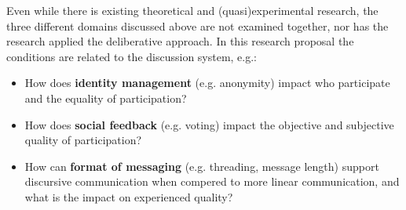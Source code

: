 \documentclass{article}
\begin{document}

Even while there is existing theoretical and (quasi)experimental research, the three different domains discussed above are not examined together, nor has the research applied the deliberative approach. In this research proposal the conditions are related to the discussion system, e.g.:

\begin{itemize}
\item How does \textbf{identity management} (e.g. anonymity) impact who participate and the equality of participation?
\item How does \textbf{social feedback} (e.g. voting) impact the objective and subjective quality of participation?
\item How can \textbf{format of messaging} (e.g. threading, message length) support discursive communication when compered to more linear communication, and what is the impact on experienced quality?
\end{itemize}
\end{document}
